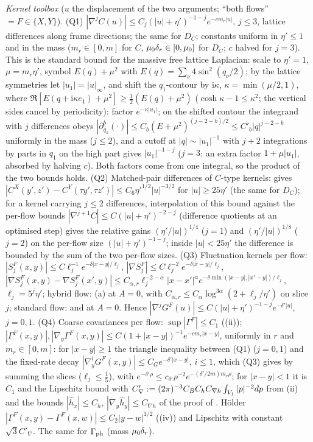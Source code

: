 \emph{Kernel toolbox} ($u$ the displacement of the two arguments; ``both flows'' $=F\in\{X,Y\}$).
(Q1) $|\nabla^jC(u)|\le C_j(|u|+\eta')^{-1-j}e^{-cm_r|u|}$, $j\le3$, lattice differences along frame directions; the same for $D_C$; constants uniform in $\eta'\le1$ and in the mass ($m_r\in[0,m]$ for $C$, $\mu_0\delta_r\in[0,\mu_0]$ for $D_C$; $c$ halved for $j=3$). This is the standard bound for the massive free lattice Laplacian: scale to $\eta'=1$, $\mu=m_r\eta'$, symbol $E(q)+\mu^2$ with $E(q)=\sum_\nu4\sin^2(q_\nu/2)$; by the lattice symmetries let $|u_1|=|u|_\infty$, and shift the $q_1$-contour by $\mathrm i\kappa$, $\kappa=\min(\mu/2,1)$, where $\Re[E(q+\mathrm i\kappa e_1)+\mu^2]\ge\frac12(E(q)+\mu^2)$ ($\cosh\kappa-1\le\kappa^2$; the vertical sides cancel by periodicity): factor $e^{-\kappa|u_1|}$; on the shifted contour the integrand with $j$ differences obeys $|\partial_{q_1}^b(\cdot)|\le C_b(E+\mu^2)^{(j-2-b)/2}\le C'_b|q|^{j-2-b}$ uniformly in the mass ($j\le2$), and a cutoff at $|q|\sim|u_1|^{-1}$ with $j+2$ integrations by parts in $q_1$ on the high part gives $|u_1|^{-1-j}$ ($j=3$: an extra factor $1+\mu|u_1|$, absorbed by halving $c$). Both factors come from one integral, so the product of the two bounds holds.
(Q2) Matched-pair differences of $C$-type kernels:  gives $|C^X(y',z')-C^Y(\tau y',\tau z')|\le C_6\eta'^{1/2}|u|^{-3/2}$ for $|u|\ge25\eta'$ (the same for $D_C$); for a kernel carrying $j\le2$ differences, interpolation of this bound against the per-flow bounds $|\nabla^{j+1}C|\le C(|u|+\eta')^{-2-j}$ (difference quotients at an optimised step) gives the relative gains $(\eta'/|u|)^{1/4}$ ($j=1$) and $(\eta'/|u|)^{1/8}$ ($j=2$) on the per-flow size $(|u|+\eta')^{-1-j}$; inside $|u|<25\eta'$ the difference is bounded by the sum of the two per-flow sizes.
(Q3) Fluctuation kernels per flow: $|S^F_j(x,y)|\le C\ell_j^{-1}e^{-\delta|x-y|/\ell_j}$, $|\nabla S^F_j|\le C\ell_j^{-2}e^{-\delta|x-y|/\ell_j}$, $|\nabla S^F_j(x,y)-\nabla S^F_j(x',y)|\le C_{\alpha,r}\ell_j^{-2-\alpha}|x-x'|^\alpha e^{-\delta\min(|x-y|,|x'-y|)/\ell_j}$, $\ell_j=5^j\eta'$; hybrid flow: (a) at $A=0$, with $C_{\alpha,r}\le C_\alpha\log^{3\alpha}(2+\ell_j/\eta')$ on slice $j$; standard flow: \cite[Lemmas~2.1, 2.2, 2.4]{Ba4} and \cite[Thm.~3.3]{K1} at $A=0$. Hence $|\nabla^jG^F(u)|\le C(|u|+\eta')^{-1-j}e^{-\delta'|u|}$, $j=0,1$.
(Q4) Coarse covariances per flow: $\sup|\Gamma^F|\le C_1$ ((ii)); $|\Gamma^F(x,y)|,|\nabla_y\Gamma^F(x,y)|\le C(1+|x-y|)^{-1}e^{-cm_r|x-y|}$, uniformly in $r$ and $m_r\in[0,m]$: for $|x-y|\ge1$ the triangle inequality between (Q1) ($j=0,1$) and the fixed-rate decay $|\nabla_y^iG^F(x,y)|\le C_Ge^{-\delta'|x-y|}$, $i\le1$, which (Q3) gives by summing the slices ($\ell_j\le\frac15$), with $e^{-\delta'\rho}\le c_{\delta'}\rho^{-2}e^{-(\delta'/2m)m_r\rho}$; for $|x-y|<1$ it is $C_1$ and the Lipschitz bound with $C'_\nabla:=(2\pi)^{-3}C_BC_hC_{\nabla h}\int_{V_1}|p|^{-2}dp$ from (ii) and the bounds $|\hat h_x|\le C_h$, $|\nabla_y\hat h_y|\le C_{\nabla h}$ of the proof of . H\"older $|\Gamma^F(x,y)-\Gamma^F(x,w)|\le C_2|y-w|^{1/2}$ ((iv)) and Lipschitz with constant $\sqrt3C'_\nabla$. The same for $\Gamma_{\rm ph}$ (mass $\mu_0\delta_r$).
